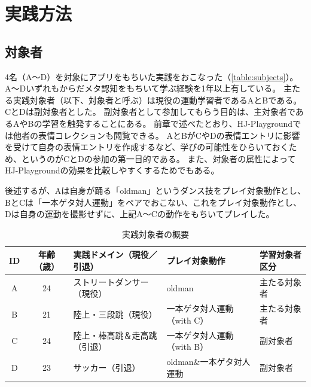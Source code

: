 \chapter{実践方法}
\label{chapter:jissenmethod}


\section{対象者}
4名（A〜D）を対象にアプリをもちいた実践をおこなった（\autoref{table:subjects}）。
A〜Dいずれもからだメタ認知をもちいて学ぶ経験を1年以上有している。
主たる実践対象者（以下、対象者と呼ぶ）は現役の運動学習者であるAとBである。
CとDは副対象者とした。
副対象者として参加してもらう目的は、主対象者であるAやBの学習を触発することにある。
前章で述べたとおり、HJ-Playgroundでは他者の表情コレクションも閲覧できる。
AとBがCやDの表情エントリに影響を受けて自身の表情エントリを作成するなど、学びの可能性をひらいておくため、というのがCとDの参加の第一目的である。
また、対象者の属性によってHJ-Playgroundの効果を比較しやすくするためでもある。

後述するが、Aは自身が踊る「oldman」というダンス技をプレイ対象動作とし、
BとCは「一本ゲタ対人運動」をペアでおこない、これをプレイ対象動作とし、
Dは自身の運動を撮影せずに、上記A〜Cの動作をもちいてプレイした。

\begin{table}[htbp]
  \centering
  \caption{実践対象者の概要}
  \begin{tabular}{c|clll}
    \hline
    \bf ID & \bf 年齢（歳） & \bf 実践ドメイン（現役／引退） & \bf プレイ対象動作 & \bf 学習対象者区分 \\
    \hline
    A  & 24 & ストリートダンサー（現役） & oldman                     & 主たる対象者 \\
    B  & 21 & 陸上・三段跳（現役）         & 一本ゲタ対人運動（with C） & 主たる対象者 \\
    C  & 24 & 陸上・棒高跳＆走高跳（引退） & 一本ゲタ対人運動（with B） & 副対象者     \\
    D  & 23 & サッカー（引退） & oldman\&一本ゲタ対人運動  & 副対象者     \\
    \hline
  \end{tabular}
\label{table:subjects}
\end{table}


